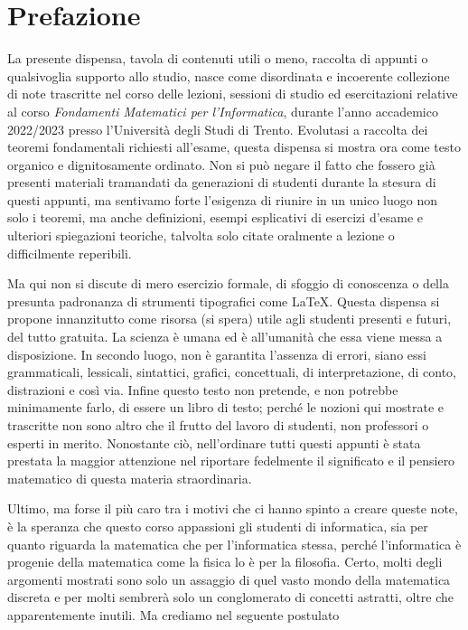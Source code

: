 \chapter*{Prefazione}

La presente dispensa, tavola di contenuti utili o meno, raccolta di appunti
o qualsivoglia supporto allo studio, nasce come disordinata e incoerente collezione di note
trascritte nel corso delle lezioni, sessioni di studio ed esercitazioni relative al
corso \textit{Fondamenti Matematici per l'Informatica}, durante l'anno accademico
2022/2023 presso l'Università degli Studi di Trento. Evolutasi a raccolta dei teoremi
fondamentali richiesti all'esame, questa dispensa si mostra ora come testo organico e
dignitosamente ordinato. Non si può negare il fatto che fossero già presenti materiali
tramandati da generazioni di studenti durante la stesura di questi appunti, ma sentivamo
forte l'esigenza di riunire in un unico luogo non solo i teoremi, ma anche definizioni,
esempi esplicativi di esercizi d'esame e ulteriori spiegazioni teoriche, talvolta solo
citate oralmente a lezione o difficilmente reperibili.

Ma qui non si discute di mero esercizio formale, di sfoggio di conoscenza o della
presunta padronanza di strumenti tipografici come \LaTeX. Questa dispensa si propone
innanzitutto come risorsa (si spera) utile agli studenti presenti e futuri, del tutto
gratuita. La scienza è umana ed è all'umanità che essa viene messa a disposizione.
In secondo luogo, non è garantita l'assenza di errori, siano essi grammaticali, lessicali,
sintattici, grafici, concettuali, di interpretazione, di conto, distrazioni e così via.
Infine questo testo non pretende, e non potrebbe minimamente farlo, di essere un libro
di testo; perché le nozioni qui mostrate e trascritte non sono altro che il frutto del
lavoro di studenti, non professori o esperti in merito. Nonostante ciò, nell'ordinare
tutti questi appunti è stata prestata la maggior attenzione nel riportare fedelmente il
significato e il pensiero matematico di questa materia straordinaria.

Ultimo, ma forse il più caro tra i motivi che ci hanno spinto a creare queste note, è
la speranza che questo corso appassioni gli studenti di informatica, sia per quanto riguarda
la matematica che per l'informatica stessa, perché l'informatica è progenie della matematica
come la fisica lo è per la filosofia. Certo, molti degli argomenti mostrati sono solo un
assaggio di quel vasto mondo della matematica discreta e per molti sembrerà solo un
conglomerato di concetti astratti, oltre che apparentemente inutili. Ma crediamo nel
seguente postulato

